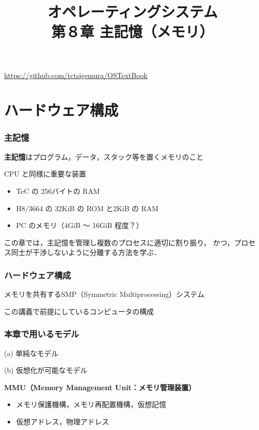 \documentclass[unicode]{beamer}                   %
\begin{document}
\title[主記憶]
      {オペレーティングシステム\\第８章 主記憶（メモリ）}
\date{}

\begin{frame}
  \titlepage
  \centerline{\url{https://github.com/tctsigemura/OSTextBook}}
\end{frame}


\section{ハードウェア構成}
\begin{frame}
  \frametitle{主記憶}

{\bf 主記憶}はプログラム，データ，スタック等を置くメモリのこと

CPU と同様に重要な装置

\begin{itemize}
\item TeC の 256バイトの RAM
\item H8/3664 の 32KiB の ROM と2KiB の RAM
\item PC のメモリ（4GiB 〜 16GiB 程度？）
\end{itemize}

この章では，主記憶を管理し複数のプロセスに適切に割り振り，
かつ，プロセス同士が干渉しないように分離する方法を学ぶ．
\end{frame}

\begin{frame}
  \frametitle{ハードウェア構成}
  メモリを共有するSMP（Symmetric Multiprocessing）システム
  \begin{center}
    この講義で前提にしているコンピュータの構成
  \end{center}
\end{frame}

\begin{frame}
  \frametitle{本章で用いるモデル}
  \begin{minipage}{0.49\columnwidth}
    \centerline{(a) 単純なモデル}
  \end{minipage}
  \begin{minipage}{0.49\columnwidth}
    \centerline{(b) 仮想化が可能なモデル}
  \end{minipage}
  \vfill
  {\bf MMU（Memory Management Unit：メモリ管理装置）}
  \begin{itemize}
  \item メモリ保護機構，メモリ再配置機構，仮想記憶
  \item 仮想アドレス，物理アドレス
  \end{itemize}
  \vfill
\end{frame}
\end{document}
